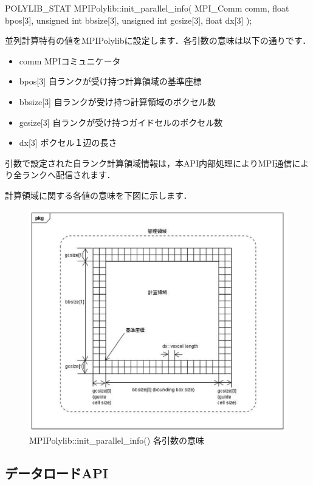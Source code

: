{\begin{program}
	POLYLIB_STAT MPIPolylib::init_parallel_info(
		MPI_Comm     comm,
		float        bpos[3],
		unsigned int bbsize[3],
		unsigned int gcsize[3],
		float        dx[3]
	);
\end{program}

並列計算特有の値をMPIPolylibに設定します．各引数の意味は以下の通りです．

\begin{itemize}
 \item comm		MPIコミュニケータ
 \item bpos[3]	自ランクが受け持つ計算領域の基準座標
 \item bbsize[3]	自ランクが受け持つ計算領域のボクセル数
 \item gcsize[3]	自ランクが受け持つガイドセルのボクセル数
 \item dx[3]		ボクセル１辺の長さ
\end{itemize}

引数で設定された自ランク計算領域情報は，本API内部処理によりMPI通信により全ランクへ配信されます．

計算領域に関する各値の意味を下図に示します．

\begin{figure}[H]
 \centering
 \includegraphics[scale=0.75]{clip006.eps}
 \caption{MPIPolylib::init\_parallel\_info() 各引数の意味}
\end{figure}


\subsection{データロードAPI}

}
